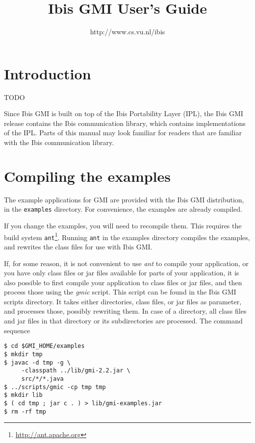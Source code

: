 \documentclass[a4paper,10pt]{article}
\begin{document}
\title{Ibis GMI User's Guide}

\author{http://www.cs.vu.nl/ibis}

\maketitle

\section{Introduction}

TODO

Since Ibis GMI is built on top of the Ibis Portability Layer (IPL),
the Ibis GMI release contains the Ibis communication library, which contains
implementations of the IPL. Parts of this manual may look familiar for
readers that are familiar with the Ibis communication library.

\section{Compiling the examples}

The example applications for GMI are
provided with the Ibis GMI distribution, in the \texttt{examples} directory.
For convenience, the examples are already compiled.

If you change the examples, you will need to recompile them. This
requires the build system \texttt{ant}\footnote{\url{http://ant.apache.org}}.
Running \texttt{ant} in the examples directory compiles the examples,
and rewrites the class files for use with Ibis GMI.

If, for some reason, it is not convenient to use \emph{ant} to compile
your application, or you have only class files or jar files available
for parts of your application, it is also possible to first compile
your application to class files or jar files, and then process those
using the \emph{gmic} script. This script can be found in the Ibis GMI
scripts directory. It takes either directories, class files, or jar files
as parameter, and processes those, possibly rewriting them. In case
of a directory, all class files and jar files in that directory or
its subdirectories are processed.  The command sequence

\begin{verbatim}
$ cd $GMI_HOME/examples
$ mkdir tmp
$ javac -d tmp -g \
     -classpath ../lib/gmi-2.2.jar \
     src/*/*.java
$ ../scripts/gmic -cp tmp tmp
$ mkdir lib
$ ( cd tmp ; jar c . ) > lib/gmi-examples.jar
$ rm -rf tmp
\end{verbatim}
\end{document}
